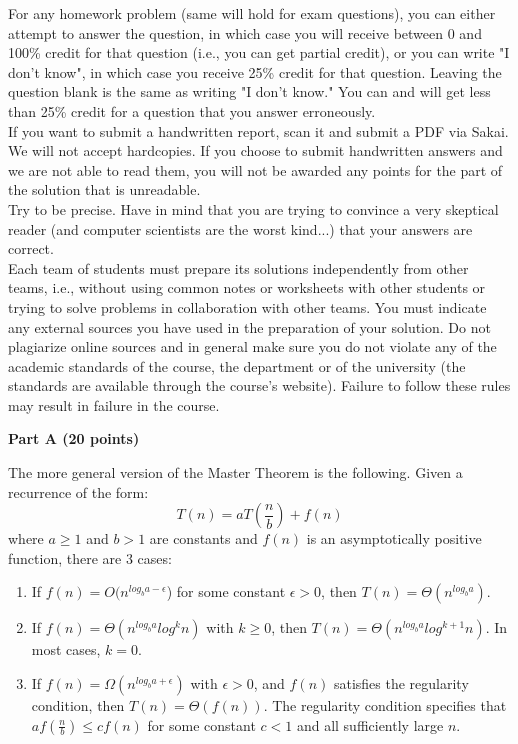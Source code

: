 \documentclass{article}
\begin{document}
 For any homework problem (same will hold
for exam questions), you can either attempt to answer the question, in
which case you will receive between 0 and 100\% credit for that
question (i.e., you can get partial credit), or you can write "I don't
know", in which case you receive 25\% credit for that question.
Leaving the question blank is the same as writing "I don't know." You
can and will get less than 25\% credit for a question that you answer
erroneously.\\

 If you want to submit a
handwritten report, scan it and submit a PDF via Sakai. We will not
accept hardcopies. If you choose to submit handwritten answers and we
are not able to read them, you will not be awarded any points for the
part of the solution that is unreadable.\\

 Try to be precise. Have in mind that you
are trying to convince a very skeptical reader (and computer
scientists are the worst kind...) that your answers are correct.\\

 Each team of students
must prepare its solutions independently from other teams, i.e.,
without using common notes or worksheets with other students or trying
to solve problems in collaboration with other teams.  You must
indicate any external sources you have used in the preparation of your
solution. Do not plagiarize online sources and in general make sure
you do not violate any of the academic standards of the course, the
department or of the university (the standards are available through
the course's website). Failure to follow these rules may result in
failure in the course.\\

\newpage

\vspace{0.1in}

{\bf }

\begin{center}
{\bf Part A (20 points)}
\end{center}

 The more general version of the Master
Theorem is the following. Given a recurrence of the form: 
$$T(n) = a T(\frac{n}{b}) + f(n)$$
where $a \geq 1$ and $b > 1$ are constants and $f(n)$ is an
asymptotically positive function, there are 3 cases: 
\begin{enumerate}
\item If $f(n) = O(n^{log_ba - \epsilon}$) for some constant $\epsilon
  > 0$, then $T(n) = \Theta(n^{log_ba})$.
\item If $f(n) = \Theta(n^{log_ba} log^kn)$ with $k \geq 0$, then
  $T(n) = \Theta(n^{log_ba} log^{k+1}n)$. In most cases, $k = 0$.
\item If $f(n) = \Omega(n^{log_ba+\epsilon})$ with $\epsilon > 0$, and
  $f(n)$ satisfies the regularity condition, then $T(n) = \Theta( f(n)
  )$. The regularity condition specifies that $a f(\frac{n}{b}) \leq c
  f(n)$ for some constant $c < 1$ and all sufficiently large $n$.
\end{enumerate}
\end{document}
